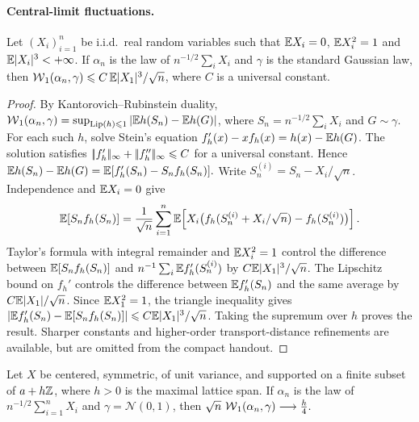 \paragraph{Central-limit fluctuations.}
\begin{prop}\label{prop-berry-esseen-w1}
Let $(X_i)_{i=1}^n$ be i.i.d.\ real random variables such that $\mathbb{E} X_i=0$, $\mathbb{E} X_i^2=1$ and $\mathbb{E} |X_i|^3<+\infty$. If $\alpha_n$ is the law of $n^{-1/2}\sum_i X_i$ and $\gamma$ is the standard Gaussian law, then $\operatorname{\mathcal{W}}_1(\alpha_n,\gamma)\leqslant C\,\mathbb{E} |X_1|^3/\sqrt n$, where $C$ is a universal constant.
\end{prop}
\begin{proof}
By Kantorovich--Rubinstein duality,
$\operatorname{\mathcal{W}}_1(\alpha_n,\gamma)=\sup_{\operatorname{Lip}(h)\leqslant1}\left|\mathbb{E} h(S_n)-\mathbb{E} h(G)\right|$, where $S_n=n^{-1/2}\sum_i X_i$ and $G\sim\gamma$.
For each such $h$, solve Stein's equation
\(f_h'(x)-x f_h(x)=h(x)-\mathbb{E} h(G)\).
The solution satisfies \(|\!| f_h' |\!|_\infty+|\!| f_h'' |\!|_\infty\leqslant C\) for a universal constant. Hence
\(\mathbb{E} h(S_n)-\mathbb{E} h(G)=\mathbb{E}[f_h'(S_n)-S_nf_h(S_n)].\)
Write \(S_n^{(i)}=S_n-X_i/\sqrt n\). Independence and \(\mathbb{E} X_i=0\) give
\[
\mathbb{E}[S_nf_h(S_n)]
=
\frac1{\sqrt n}\sum_{i=1}^n
\mathbb{E}\!\left[X_i\big(f_h(S_n^{(i)}+X_i/\sqrt n)-f_h(S_n^{(i)})\big)\right].
\]
Taylor's formula with integral remainder and \(\mathbb{E} X_i^2=1\) control the difference between \(\mathbb{E}[S_nf_h(S_n)]\) and \(n^{-1}\sum_i\mathbb{E} f_h'(S_n^{(i)})\) by \(C\mathbb{E}|X_1|^3/\sqrt n\). The Lipschitz bound on \(f_h'\) controls the difference between \(\mathbb{E} f_h'(S_n)\) and the same average by \(C\mathbb{E}|X_1|/\sqrt n\). Since \(\mathbb{E} X_1^2=1\), the triangle inequality gives \(\left|\mathbb{E} f_h'(S_n)-\mathbb{E}[S_nf_h(S_n)]\right|\leqslant C\mathbb{E}|X_1|^3/\sqrt n\). Taking the supremum over \(h\) proves the result. Sharper constants and higher-order transport-distance refinements are available, but are omitted from the compact handout.
\end{proof}
\begin{prop}\label{prop-sharp-lattice-w1-clt}
Let \(X\) be centered, symmetric, of unit variance, and supported on a finite subset of \(a+h\mathbb{Z}\), where \(h>0\) is the maximal lattice span. If \(\alpha_n\) is the law of \(n^{-1/2}\sum_{i=1}^nX_i\) and \(\gamma=\mathcal N(0,1)\), then
\(\sqrt n\,\operatorname{\mathcal{W}}_1(\alpha_n,\gamma)\longrightarrow \frac h4.\)
\end{prop}
